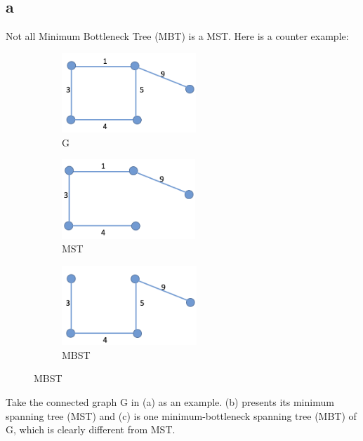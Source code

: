 \documentclass[a4paper,10pt,twoside]{article}
\begin{document}
\subsection*{a}
Not all Minimum Bottleneck Tree (MBT) is a MST. Here is a counter example:

\begin{figure}[h]
 
\begin{subfigure}{0.3\textwidth}
\includegraphics[width=0.9\linewidth, height=3cm]{G} 
\caption{G}
\label{fig:subim1}
\end{subfigure}
\begin{subfigure}{0.3\textwidth}
\includegraphics[width=0.9\linewidth, height=3cm]{MST}
\caption{MST}
\label{fig:subim2}
\end{subfigure}
 \begin{subfigure}{0.3\textwidth}
\includegraphics[width=0.9\linewidth, height=3cm]{MBST}
\caption{MBST}
\label{fig:subim3}
\end{subfigure}


\end{figure}

Take the connected graph G in (a) as an example. (b) presents its minimum spanning tree (MST) and (c) is one minimum-bottleneck spanning tree (MBT) of G, which is clearly different from MST. 
\end{document}
